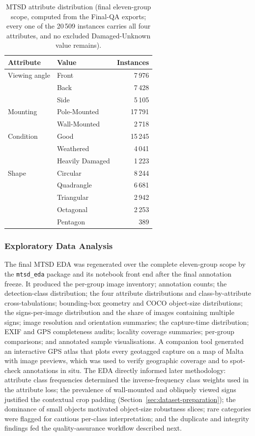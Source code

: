 \begin{table}[htbp]
\centering
\caption{MTSD attribute distribution (final eleven-group scope, computed from the Final-QA exports; every one of the 20\,509 instances carries all four attributes, and no excluded Damaged-Unknown value remains).}
\label{tab:mtsd-attr-dist}
\small
\begin{tabular}{llr}
\hline
\textbf{Attribute} & \textbf{Value} & \textbf{Instances} \\
\hline
Viewing angle & Front & 7\,976 \\
 & Back & 7\,428 \\
 & Side & 5\,105 \\
\hline
Mounting & Pole-Mounted & 17\,791 \\
 & Wall-Mounted & 2\,718 \\
\hline
Condition & Good & 15\,245 \\
 & Weathered & 4\,041 \\
 & Heavily Damaged & 1\,223 \\
\hline
Shape & Circular & 8\,244 \\
 & Quadrangle & 6\,681 \\
 & Triangular & 2\,942 \\
 & Octagonal & 2\,253 \\
 & Pentagon & 389 \\
\hline
\end{tabular}
\end{table}

\subsubsection{Exploratory Data Analysis}

The final MTSD EDA was regenerated over the complete eleven-group scope by the \texttt{mtsd\_eda} package and its notebook front end after the final annotation freeze. It produced the per-group image inventory; annotation counts; the detection-class distribution; the four attribute distributions and class-by-attribute cross-tabulations; bounding-box geometry and COCO object-size distributions; the signs-per-image distribution and the share of images containing multiple signs; image resolution and orientation summaries; the capture-time distribution; EXIF and GPS completeness audits; locality coverage summaries; per-group comparisons; and annotated sample visualisations. A companion tool generated an interactive GPS atlas that plots every geotagged capture on a map of Malta with image previews, which was used to verify geographic coverage and to spot-check annotations in situ. The EDA directly informed later methodology: attribute class frequencies determined the inverse-frequency class weights used in the attribute loss; the prevalence of wall-mounted and obliquely viewed signs justified the contextual crop padding (Section~\ref{sec:dataset-preparation}); the dominance of small objects motivated object-size robustness slices; rare categories were flagged for cautious per-class interpretation; and the duplicate and integrity findings fed the quality-assurance workflow described next.

